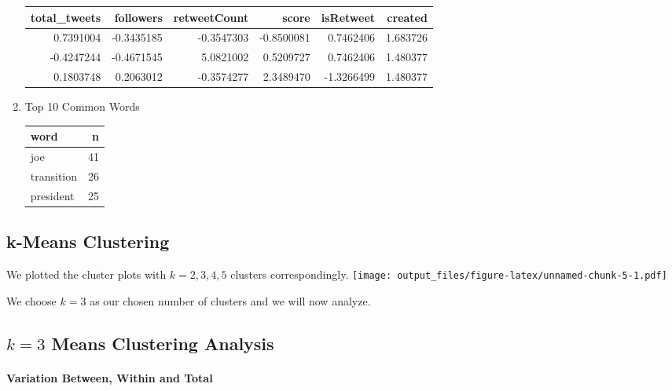 \documentclass[]{article}
\let\oldparagraph\paragraph
\renewcommand{\paragraph}[1]{\oldparagraph{#1}\mbox{}}
\begin{document}
\begin{enumerate}
  \begin{table}[H]
  \centering
  \begin{tabular}[t]{r|r|r|r|r|r}
  \hline
  total\_tweets & followers & retweetCount & score & isRetweet & created\\
  \hline
  0.7391004 & -0.3435185 & -0.3547303 & -0.8500081 & 0.7462406 & 1.683726\\
  \hline
  -0.4247244 & -0.4671545 & 5.0821002 & 0.5209727 & 0.7462406 & 1.480377\\
  \hline
  0.1803748 & 0.2063012 & -0.3574277 & 2.3489470 & -1.3266499 & 1.480377\\
  \hline
  \end{tabular}
  \end{table}
\item
  Top 10 Common Words

  \begin{table}[H]
  \centering
  \begin{tabular}[t]{l|r}
  \hline
  word & n\\
  \hline
  joe & 41\\
  \hline
  transition & 26\\
  \hline
  president & 25\\
  \hline
  \end{tabular}
  \end{table}
\end{enumerate}

\subsection{k-Means Clustering}\label{k-means-clustering}

We plotted the cluster plots with \(k=2,3,4,5\) clusters
correspondingly.
\texttt{[image: output\_files/figure-latex/unnamed-chunk-5-1.pdf]}

We choose \(k=3\) as our chosen number of clusters and we will now
analyze.

\subsection{\texorpdfstring{\(k=3\) Means Clustering
Analysis}{k=3 Means Clustering Analysis}}\label{k3-means-clustering-analysis}

\paragraph{Variation Between, Within and
Total}\label{variation-between-within-and-total}
\end{document}
